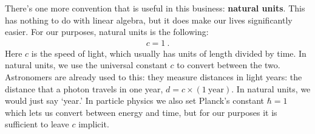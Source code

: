 There's one more convention that is useful in this business: \textbf{natural units}. This has nothing to do with linear algebra, but it does make our lives significantly easier. For our purposes, natural units is the following:
\begin{align}
    c = 1 \ .
\end{align}
Here $c$ is the speed of light, which usually has units of length divided by time. In natural units, we use the universal constant $c$ to convert between the two. Astronomers are already used to this: they measure distances in light years: the distance that a photon travels in one year, $d = c\times(1~\text{year})$. In natural units, we would just say `year.' In particle physics we also set Planck's constant $\hbar = 1$ which lets us convert between energy and time, but for our purposes it is sufficient to leave $c$ implicit. 

